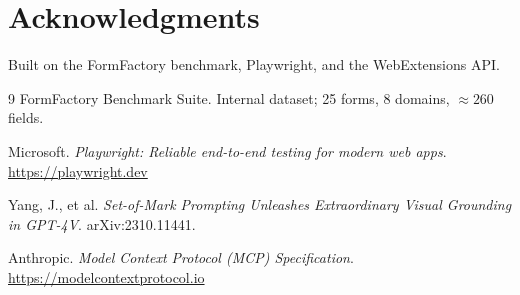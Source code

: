 \documentclass[conference]{IEEEtran}
\begin{document}
\section*{Acknowledgments}
Built on the FormFactory benchmark, Playwright, and the
WebExtensions API.

\begin{thebibliography}{9}
  FormFactory Benchmark Suite.
  Internal dataset; 25 forms, 8 domains, $\approx 260$ fields.

  Microsoft. \emph{Playwright: Reliable end-to-end testing for modern
  web apps}. \url{https://playwright.dev}

  Yang, J., et al.
  \emph{Set-of-Mark Prompting Unleashes Extraordinary Visual Grounding
  in GPT-4V}. arXiv:2310.11441.

  Anthropic. \emph{Model Context Protocol (MCP) Specification}.
  \url{https://modelcontextprotocol.io}
\end{thebibliography}
\end{document}
